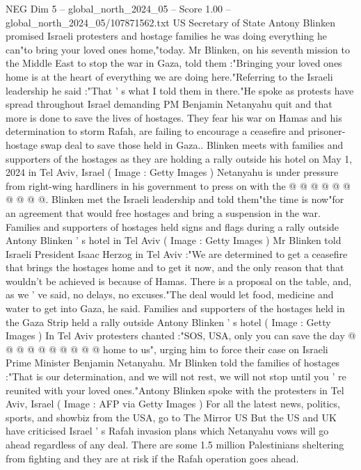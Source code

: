 \begin{textsample}{NEG Dim 5 – global\_north\_2024\_05 – Score 1.00 – global\_north\_2024\_05/107871562.txt}  \label{ex:f5_neg_289}
US Secretary of State Antony Blinken promised Israeli protesters and hostage families he was doing everything he can"to bring your loved ones home,"today.
Mr Blinken, on his seventh mission to the Middle East to stop the war in Gaza, told them :"Bringing your loved ones home is at the heart of everything we are doing here."Referring to the Israeli leadership he said :"That ' s what I told them in there."He spoke as protests have spread throughout Israel demanding PM Benjamin Netanyahu quit and that more is done to save the lives of hostages.
They fear his war on Hamas and his determination to storm Rafah, are failing to encourage a ceasefire and prisoner-hostage swap deal to save those held in Gaza..
Blinken meets with families and supporters of the hostages as they are holding a rally outside his hotel on May 1, 2024 in Tel Aviv, Israel ( Image : Getty Images ) Netanyahu is under pressure from right-wing hardliners in his government to press on with the @ @ @ @ @ @ @ @ @ @.
Blinken met the Israeli leadership and told them"the time is now"for an agreement that would free hostages and bring a suspension in the war.
Families and supporters of hostages held signs and flags during a rally outside Antony Blinken ' s hotel in Tel Aviv ( Image : Getty Images ) Mr Blinken told Israeli President Isaac Herzog in Tel Aviv :"We are determined to get a ceasefire that brings the hostages home and to get it now, and the only reason that that wouldn't be achieved is because of Hamas.
There is a proposal on the table, and, as we ' ve said, no delays, no excuses."The deal would let food, medicine and water to get into Gaza, he said.
Families and supporters of the hostages held in the Gaza Strip held a rally outside Antony Blinken ' s hotel ( Image : Getty Images ) In Tel Aviv protesters chanted :"SOS, USA, only you can save the day @ @ @ @ @ @ @ @ @ @ home to us", urging him to force their case on Israeli Prime Minister Benjamin Netanyahu.
Mr Blinken told the families of hostages :"That is our determination, and we will not rest, we will not stop until you ' re reunited with your loved ones."Antony Blinken spoke with the protesters in Tel Aviv, Israel ( Image : AFP via Getty Images ) For all the latest news, politics, sports, and showbiz from the USA, go to The Mirror US But the US and UK have criticised Israel ' s Rafah invasion plans which Netanyahu vows will go ahead regardless of any deal.
There are some 1.5 million Palestinians sheltering from fighting and they are at risk if the Rafah operation goes ahead.

\end{textsample}
